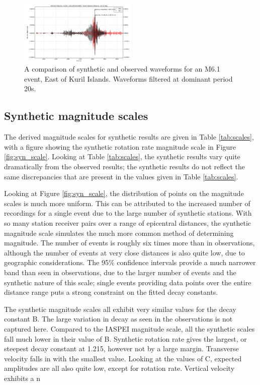 \documentclass{gji}
\begin{document}
\begin{figure}
\centerline{\includegraphics[width=0.5\textwidth]{both_waveformsC201304191958A}}
\caption{A comparison of synthetic and observed waveforms for an M6.1 event, East of Kuril Islands. Waveforms filtered at dominant period 20s.}
\label{fig:both}
\end{figure}

\subsection{Synthetic magnitude scales}
The derived magnitude scales for synthetic results are given in Table \ref{tab:scales}, with a figure showing the synthetic rotation rate magnitude scale in Figure \ref{fig:syn_scale}. Looking at Table \ref{tab:scales}, the synthetic results vary quite dramatically from the observed results; the synthetic results do not reflect the same discrepancies that are present in the values given in Table \ref{tab:scales}.

Looking at Figure \ref{fig:syn_scale}, the distribution of points on the magnitude scales is much more uniform. This can be attributed to the increased number of recordings for a single event due to the large number of synthetic stations. With so many station receiver pairs over a range of epicentral distances, the synthetic magnitude scale simulates the much more common method of determining magnitude. The number of events is roughly six times more than in observations, although the number of events at very close distances is also quite low, due to geographic considerations. The 95\% confidence intervals provide a much narrower band than seen in observations, due to the larger number of events and the synthetic nature of this scale; single events providing data points over the entire distance range puts a strong constraint on the fitted decay constants.

The synthetic magnitude scales all exhibit very similar values for the decay constant B. The large variation in decay as seen in the observations is not captured here. Compared to the IASPEI magnitude scale, all the synthetic scales fall much lower in their value of B. Synthetic rotation rate gives the largest, or steepest decay constant at 1.215, however not by a large margin. Transverse velocity falls in with the smallest value. Looking at the values of C, expected amplitudes are all also quite low, except for rotation rate. Vertical velocity exhibits a n
\end{document}
